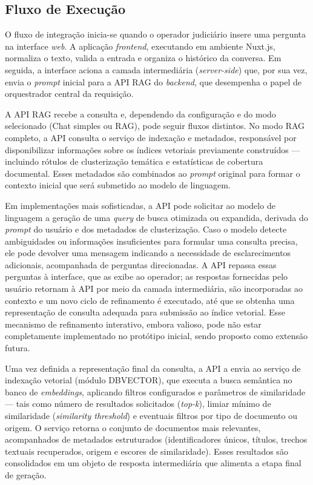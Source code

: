 \subsection{Fluxo de Execução}

O fluxo de integração inicia-se quando o operador judiciário insere uma pergunta na interface \textit{web}. A aplicação \textit{frontend}, executando em ambiente Nuxt.js, normaliza o texto, valida a entrada e organiza o histórico da conversa. Em seguida, a interface aciona a camada intermediária (\textit{server-side}) que, por sua vez, envia o \textit{prompt} inicial para a API RAG do \textit{backend}, que desempenha o papel de orquestrador central da requisição.

A API RAG recebe a consulta e, dependendo da configuração e do modo selecionado (Chat simples ou RAG), pode seguir fluxos distintos. No modo RAG completo, a API consulta o serviço de indexação e metadados, responsável por disponibilizar informações sobre os índices vetoriais previamente construídos --- incluindo rótulos de clusterização temática e estatísticas de cobertura documental. Esses metadados são combinados ao \textit{prompt} original para formar o contexto inicial que será submetido ao modelo de linguagem.

Em implementações mais sofisticadas, a API pode solicitar ao modelo de linguagem a geração de uma \textit{query} de busca otimizada ou expandida, derivada do \textit{prompt} do usuário e dos metadados de clusterização. Caso o modelo detecte ambiguidades ou informações insuficientes para formular uma consulta precisa, ele pode devolver uma mensagem indicando a necessidade de esclarecimentos adicionais, acompanhada de perguntas direcionadas. A API repassa essas perguntas à interface, que as exibe ao operador; as respostas fornecidas pelo usuário retornam à API por meio da camada intermediária, são incorporadas ao contexto e um novo ciclo de refinamento é executado, até que se obtenha uma representação de consulta adequada para submissão ao índice vetorial. Esse mecanismo de refinamento interativo, embora valioso, pode não estar completamente implementado no protótipo inicial, sendo proposto como extensão futura.

Uma vez definida a representação final da consulta, a API a envia ao serviço de indexação vetorial (módulo DBVECTOR), que executa a busca semântica no banco de \textit{embeddings}, aplicando filtros configurados e parâmetros de similaridade --- tais como número de resultados solicitados (\textit{top-k}), limiar mínimo de similaridade (\textit{similarity threshold}) e eventuais filtros por tipo de documento ou origem. O serviço retorna o conjunto de documentos mais relevantes, acompanhados de metadados estruturados (identificadores únicos, títulos, trechos textuais recuperados, origem e escores de similaridade). Esses resultados são consolidados em um objeto de resposta intermediária que alimenta a etapa final de geração.

